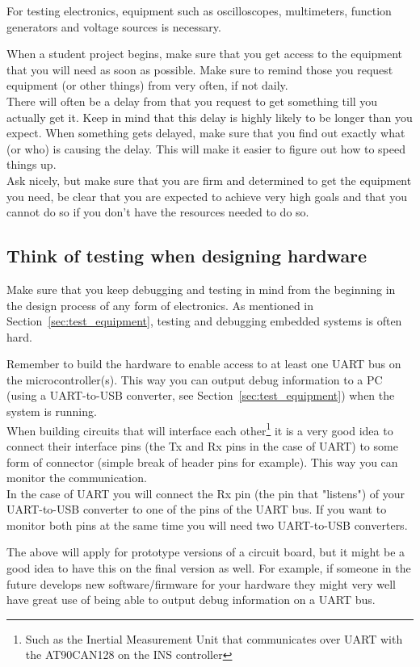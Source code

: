 For testing electronics, equipment such as oscilloscopes, multimeters, function generators and voltage sources is necessary.

When a student project begins, make sure that you get access to the equipment that you will need as soon as possible.  Make sure to remind those you request equipment (or other things) from very often, if not daily. \\
There will often be a delay from that you request to get something till you actually get it. Keep in mind that this delay is highly likely to be longer than you expect. When something gets delayed, make sure that you find out exactly what (or who) is causing the delay. This will make it easier to figure out how to speed things up. \\
Ask nicely, but make sure that you are firm and determined to get the equipment you need, be clear that you are expected to achieve very high goals and that you cannot do so if you don't have the resources needed to do so.


\subsection{Think of testing when designing hardware}\label{sec:testing}
Make sure that you keep debugging and testing in mind from the beginning in the design process of any form of electronics. As mentioned in Section~\ref{sec:test_equipment}, testing and debugging embedded systems is often hard. 

Remember to build the hardware to enable access to at least one UART bus on the microcontroller(s). This way you can output debug information to a PC (using a UART-to-USB converter, see Section~\ref{sec:test_equipment}) when the system is running. \\
When building circuits that will interface each other\footnote{Such as the Inertial Measurement Unit that communicates over UART with the AT90CAN128 on the INS controller} it is a very good idea to connect their interface pins (the Tx and Rx pins in the case of UART) to some form of connector (simple break of header pins for example). This way you can monitor the communication. \\
In the case of UART you will connect the Rx pin (the pin that "listens") of your UART-to-USB converter to one of the pins of the UART bus. If you want to monitor both pins at the same time you will need two UART-to-USB converters.

The above will apply for prototype versions of a circuit board, but it might be a good idea to have this on the final version as well. For example, if someone in the future develops new software/firmware for your hardware they might very well have great use of being able to output debug information on a UART bus.


